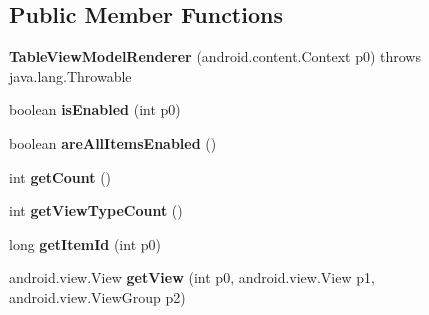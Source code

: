 \subsection*{Public Member Functions}
\begin{DoxyCompactItemize}
\item 
\hypertarget{classmd5282f1122c1313907b9bf274dd2c2f344_1_1TableViewModelRenderer_a54060d605fa086cca67848928d4d9329}{}{\bfseries Table\+View\+Model\+Renderer} (android.\+content.\+Context p0)  throws java.\+lang.\+Throwable 	\label{classmd5282f1122c1313907b9bf274dd2c2f344_1_1TableViewModelRenderer_a54060d605fa086cca67848928d4d9329}

\item 
\hypertarget{classmd5282f1122c1313907b9bf274dd2c2f344_1_1TableViewModelRenderer_aeb0b2476ebef8bebe03af5e86ce69e9e}{}boolean {\bfseries is\+Enabled} (int p0)\label{classmd5282f1122c1313907b9bf274dd2c2f344_1_1TableViewModelRenderer_aeb0b2476ebef8bebe03af5e86ce69e9e}

\item 
\hypertarget{classmd5282f1122c1313907b9bf274dd2c2f344_1_1TableViewModelRenderer_a7759564c8a957eb2dcf7d37c26b86207}{}boolean {\bfseries are\+All\+Items\+Enabled} ()\label{classmd5282f1122c1313907b9bf274dd2c2f344_1_1TableViewModelRenderer_a7759564c8a957eb2dcf7d37c26b86207}

\item 
\hypertarget{classmd5282f1122c1313907b9bf274dd2c2f344_1_1TableViewModelRenderer_a8e75bda87b110c757fa6cfe7c16cf093}{}int {\bfseries get\+Count} ()\label{classmd5282f1122c1313907b9bf274dd2c2f344_1_1TableViewModelRenderer_a8e75bda87b110c757fa6cfe7c16cf093}

\item 
\hypertarget{classmd5282f1122c1313907b9bf274dd2c2f344_1_1TableViewModelRenderer_af1457f7ea643f4c1d069786555e2aab0}{}int {\bfseries get\+View\+Type\+Count} ()\label{classmd5282f1122c1313907b9bf274dd2c2f344_1_1TableViewModelRenderer_af1457f7ea643f4c1d069786555e2aab0}

\item 
\hypertarget{classmd5282f1122c1313907b9bf274dd2c2f344_1_1TableViewModelRenderer_a1f1daca3efb8d2a6ad81023bfa5b8f20}{}long {\bfseries get\+Item\+Id} (int p0)\label{classmd5282f1122c1313907b9bf274dd2c2f344_1_1TableViewModelRenderer_a1f1daca3efb8d2a6ad81023bfa5b8f20}

\item 
\hypertarget{classmd5282f1122c1313907b9bf274dd2c2f344_1_1TableViewModelRenderer_a5be75910d5eee3d7ac99314669cd030f}{}android.\+view.\+View {\bfseries get\+View} (int p0, android.\+view.\+View p1, android.\+view.\+View\+Group p2)\label{classmd5282f1122c1313907b9bf274dd2c2f344_1_1TableViewModelRenderer_a5be75910d5eee3d7ac99314669cd030f}


\end{DoxyCompactItemize}
